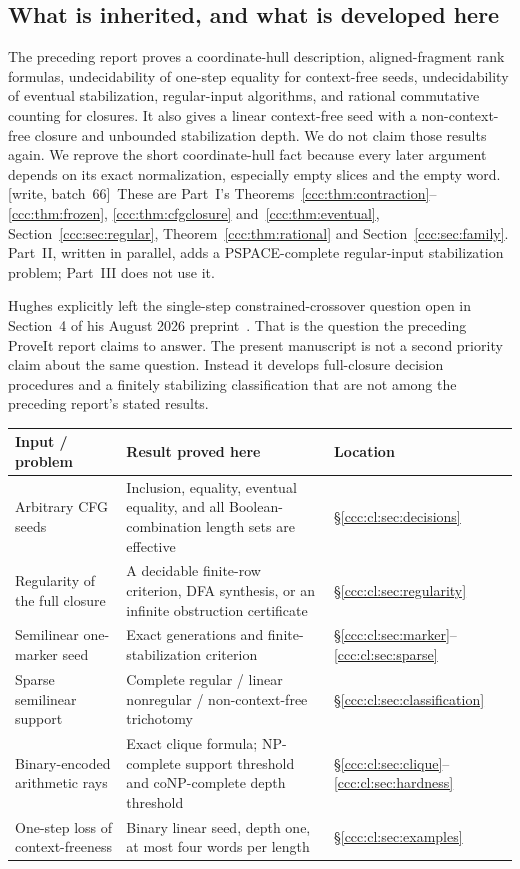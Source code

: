 \documentclass[11pt,letterpaper]{article}
\theoremstyle{definition}
\theoremstyle{remark}
\newcommand{\wsix}{\textup{[write, batch~66]}}
\begin{document}
\subsection{What is inherited, and what is developed here}

The preceding report proves a coordinate-hull description, aligned-fragment
rank formulas, undecidability of one-step equality for context-free seeds,
undecidability of eventual stabilization, regular-input algorithms, and
rational commutative counting for closures. It also gives a linear
context-free seed with a non-context-free closure and unbounded stabilization
depth. We do not claim those results again. We reprove the short
coordinate-hull fact because every later argument depends on its exact
normalization, especially empty slices and the empty word.
\wsix\ These are Part~I's Theorems~\ref{ccc:thm:contraction}--\ref{ccc:thm:frozen},
\ref{ccc:thm:cfgclosure} and~\ref{ccc:thm:eventual}, Section~\ref{ccc:sec:regular},
Theorem~\ref{ccc:thm:rational} and Section~\ref{ccc:sec:family}. Part~II,
written in parallel, adds a PSPACE-complete regular-input stabilization
problem; Part~III does not use it.

Hughes explicitly left the single-step constrained-crossover question open
in Section~4 of his August 2026 preprint~\cite{Hughes}. That is the question
the preceding ProveIt report claims to answer. The present manuscript is
not a second priority claim about the same question. Instead it develops
full-closure decision procedures and a finitely stabilizing classification
that are not among the preceding report's stated results.

\begin{center}\small
\begin{tabular}{@{}P{.26\textwidth}P{.58\textwidth}P{.10\textwidth}@{}}
\toprule
\textbf{Input / problem} & \textbf{Result proved here} & \textbf{Location}\\
\midrule
Arbitrary CFG seeds & Inclusion, equality, eventual equality, and all
Boolean-combination length sets are effective & \S\ref{ccc:cl:sec:decisions}\\[4pt]
Regularity of the full closure & A decidable finite-row criterion, DFA
synthesis, or an infinite obstruction certificate & \S\ref{ccc:cl:sec:regularity}\\[4pt]
Semilinear one-marker seed & Exact generations and finite-stabilization
criterion & \S\ref{ccc:cl:sec:marker}--\ref{ccc:cl:sec:sparse}\\[4pt]
Sparse semilinear support & Complete regular / linear nonregular /
non-context-free trichotomy & \S\ref{ccc:cl:sec:classification}\\[4pt]
Binary-encoded arithmetic rays & Exact clique formula; NP-complete support
threshold and coNP-complete depth threshold & \S\ref{ccc:cl:sec:clique}--\ref{ccc:cl:sec:hardness}\\[4pt]
One-step loss of context-freeness & Binary linear seed, depth one,
at most four words per length & \S\ref{ccc:cl:sec:examples}\\
\bottomrule
\end{tabular}
\end{center}
\end{document}
